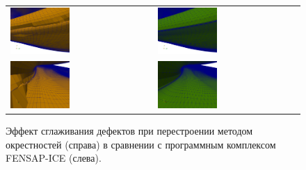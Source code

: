 \documentclass[a4paper,14pt]{extarticle}                     %
\theoremstyle{plain}                                         %
\begin{document}
\begin{figure}[!ht]
\centering
\begin{tabular}{ll}
\includegraphics[width=0.43\textwidth]{fig/3dr_fens1.png}
&
\includegraphics[width=0.43\textwidth]{fig/3dr_crys1.png} \\
\includegraphics[width=0.43\textwidth]{fig/3dr_fens2.png}
&
\includegraphics[width=0.43\textwidth]{fig/3dr_crys2.png}
\end{tabular}
\singlespacing
\caption{Эффект сглаживания дефектов при перестроении методом окрестностей (справа) в сравнении с программным комплексом FENSAP-ICE (слева).}
\label{fig:text_1_remesh3_with_fensap}
\end{figure}
\end{document}
